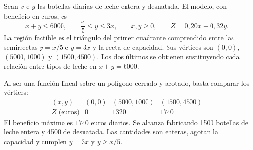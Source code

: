 Sean $x$ e $y$ las botellas diarias de leche entera y desnatada. El modelo, con beneficio en euros, es
\[
 x+y\le6000,\qquad \frac{x}{5}\le y\le3x,\qquad x,y\ge0,
 \qquad Z=0{,}20x+0{,}32y.
\]
La región factible es el triángulo del primer cuadrante comprendido entre las semirrectas $y=x/5$ e $y=3x$ y la recta de capacidad. Sus vértices son $(0,0)$, $(5000,1000)$ y $(1500,4500)$. Los dos últimos se obtienen sustituyendo cada relación entre tipos de leche en $x+y=6000$.

Al ser una función lineal sobre un polígono cerrado y acotado, basta comparar los vértices:
\[
 \begin{array}{c|rrr}
 (x,y)&(0,0)&(5000,1000)&(1500,4500)\\
 Z\text{ (euros)}&0&1320&1740
 \end{array}
\]
El beneficio máximo es $\boxed{1740}$ euros diarios. Se alcanza fabricando 1500 botellas de leche entera y 4500 de desnatada. Las cantidades son enteras, agotan la capacidad y cumplen $y=3x$ y $y\ge x/5$.
